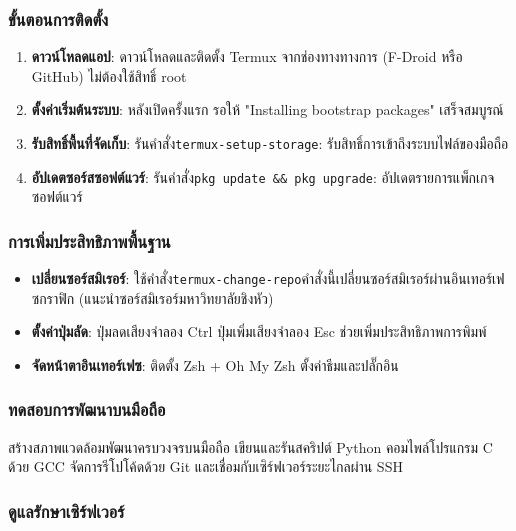 
\subsubsection*{ขั้นตอนการติดตั้ง}

\begin{enumerate}
  \item \textbf{ดาวน์โหลดแอป}: ดาวน์โหลดและติดตั้ง Termux จากช่องทางทางการ (F-Droid หรือ GitHub) ไม่ต้องใช้สิทธิ์ root
  \item \textbf{ตั้งค่าเริ่มต้นระบบ}: หลังเปิดครั้งแรก รอให้ "Installing bootstrap packages" เสร็จสมบูรณ์
  \item \textbf{รับสิทธิ์พื้นที่จัดเก็บ}: รันคำสั่ง\texttt{termux-\allowbreak setup-\allowbreak storage}: รับสิทธิ์การเข้าถึงระบบไฟล์ของมือถือ
  \item \textbf{อัปเดตซอร์สซอฟต์แวร์}: รันคำสั่ง\texttt{pkg update \&\& pkg upgrade}: อัปเดตรายการแพ็กเกจซอฟต์แวร์
\end{enumerate}

\subsubsection*{การเพิ่มประสิทธิภาพพื้นฐาน}

\begin{itemize}
  \item \textbf{เปลี่ยนซอร์สมิเรอร์}: ใช้คำสั่ง\texttt{termux-\allowbreak change-\allowbreak repo}คำสั่งนี้เปลี่ยนซอร์สมิเรอร์ผ่านอินเทอร์เฟซกราฟิก (แนะนำซอร์สมิเรอร์มหาวิทยาลัยชิงหัว)
  \item \textbf{ตั้งค่าปุ่มลัด}: ปุ่มลดเสียงจำลอง Ctrl ปุ่มเพิ่มเสียงจำลอง Esc ช่วยเพิ่มประสิทธิภาพการพิมพ์
  \item \textbf{จัดหน้าตาอินเทอร์เฟซ}: ติดตั้ง Zsh + Oh My Zsh ตั้งค่าธีมและปลั๊กอิน
\end{itemize}


\subsubsection*{ทดสอบการพัฒนาบนมือถือ}

สร้างสภาพแวดล้อมพัฒนาครบวงจรบนมือถือ เขียนและรันสคริปต์ Python คอมไพล์โปรแกรม C ด้วย GCC จัดการรีโปโค้ดด้วย Git และเชื่อมกับเซิร์ฟเวอร์ระยะไกลผ่าน SSH

\subsubsection*{ดูแลรักษาเซิร์ฟเวอร์}

